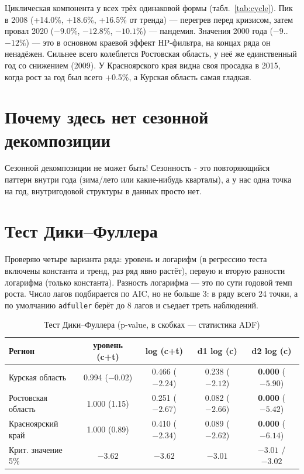 \documentclass[12pt,a4paper]{report}
\begin{document}
Циклическая компонента у всех трёх одинаковой формы (табл.~\ref{tab:cycle}). Пик в 2008 (+14.0\%, +18.6\%, +16.5\% от тренда) --- перегрев перед кризисом, затем провал 2020 ($-9.0\%$, $-12.8\%$, $-10.1\%$) --- пандемия. Значения 2000 года ($-9$..$-12\%$) --- это в основном краевой эффект HP-фильтра, на концах ряда он ненадёжен. Сильнее всего колеблется Ростовская область, у неё же единственный год со снижением (2009). У Красноярского края видна своя просадка в 2015, когда рост за год был всего +0.5\%, а Курская область самая гладкая.

\section{Почему здесь нет сезонной декомпозиции}

Сезонной декомпозиции не может быть! Сезонность - это повторяющийся паттерн внутри года (зима/лето или какие-нибудь кварталы), а у нас одна точка на год, внутригодовой структуры в данных просто нет.

\section{Тест Дики--Фуллера}

Проверяю четыре варианта ряда: уровень и логарифм (в регрессию теста включены константа и тренд, раз ряд явно растёт), первую и вторую разности логарифма (только константа). Разность логарифма --- это по сути годовой темп роста. Число лагов подбирается по AIC, но не больше 3: в ряду всего 24 точки, а по умолчанию \texttt{adfuller} берёт до 8 лагов и съедает треть наблюдений.

\begin{table}[H]
\centering
\caption{Тест Дики--Фуллера (p-value, в скобках --- статистика ADF)}
\label{tab:adf}
\small
\begin{tabular}{lcccc}
\toprule
Регион & уровень (c+t) & log (c+t) & d1 log (c) & d2 log (c) \\
\midrule
Курская область & 0.994 ($-0.02$) & 0.466 ($-2.24$) & 0.238 ($-2.12$) & \textbf{0.000} ($-5.90$) \\
Ростовская область & 1.000 (1.15) & 0.251 ($-2.67$) & 0.082 ($-2.66$) & \textbf{0.000} ($-5.42$) \\
Красноярский край & 1.000 (0.89) & 0.410 ($-2.34$) & 0.089 ($-2.62$) & \textbf{0.000} ($-6.14$) \\
\midrule
Крит. значение 5\% & $-3.62$ & $-3.62$ & $-3.01$ & $-3.01$ / $-3.02$ \\
\bottomrule
\end{tabular}
\end{table}
\end{document}
